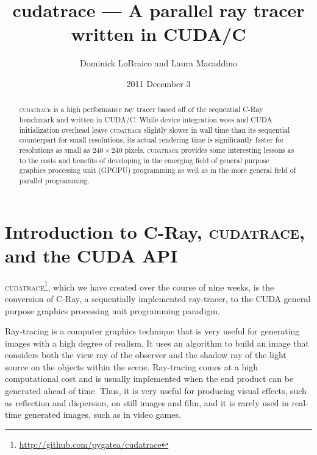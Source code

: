 \documentclass[12pt]{article}
\begin{document}
\lstset{language=C,breaklines=true,frame=single,basicstyle=\footnotesize}

\title{cudatrace --- A parallel ray tracer written in CUDA/C}
\author{Dominick LoBraico and Laura Macaddino}
\date{2011 December 3}
\maketitle

\begin{abstract}
    \textsc{cudatrace} is a high performance ray tracer based off of the sequential C-Ray benchmark and written in CUDA/C. While device integration woes and CUDA initialization overhead leave \textsc{cudatrace} slightly slower in wall time than its sequential counterpart for small resolutions, its actual rendering time is significantly faster for resolutions as small as $240 \times 240$ pixels. \textsc{cudatrace} provides some interesting lessons as to the costs and benefits of developing in the emerging field of general purpose graphics processing unit (GPGPU) programming as well as in the more general field of parallel programming.
\end{abstract}

\pagebreak
\tableofcontents
\listoffigures
\listoftables
\pagebreak


\section[Introduction]{Introduction to C-Ray, \textsc{cudatrace}, and the CUDA API}
\textsc{cudatrace}\footnote{\url{http://github.com/pygatea/cudatrace}}, which we have created over the course of nine weeks, is the conversion of C-Ray, a sequentially implemented ray-tracer, to the CUDA general purpose graphics processing unit programming paradigm.

Ray-tracing is a computer graphics technique that is very useful for generating images with a high degree of realism. It uses an algorithm to build an image that considers both the view ray of the observer and the shadow ray of the light source on the objects within the scene. Ray-tracing comes at a high computational cost and is usually implemented when the end product can be generated ahead of time. Thus, it is very useful for producing visual effects, such as reflection and dispersion, on still images and film, and it is rarely used in real-time generated images, such as in video games.
\end{document}
